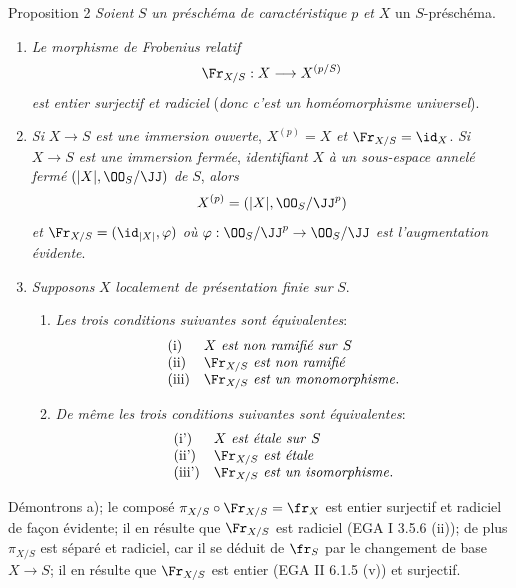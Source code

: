 \begin{statement}{Proposition 2}
\emph{Soient} $S$ \emph{un préschéma de caractéristique} $p$ \emph{et} $X$ un $S$-préschéma.
\begin{enumerate}[label=\alph*)]
\item \emph{Le morphisme de Frobenius relatif}
\[
\Fr_{X/S}:X\longrightarrow X^{(p/S)}
\]
\emph{est entier surjectif et radiciel} (\emph{donc c'est un homéomorphisme universel}).

\item \emph{Si} $X\to S$ \emph{est une
immersion ouverte}, $X^{(p)}=X$ \emph{et} $\Fr_{X/S}=\id_X$. \emph{Si} $X\to S$ \emph{est une immersion fermée}, \emph{identifiant} $X$ \emph{à un sous-espace annelé fermé} $(|X|,\OO_S/\JJ)$ \emph{de} $S$, \emph{alors}
\[
X^{(p)}=(|X|,\OO_S/\JJ^p)
\]
\emph{et} $\Fr_{X/S}=(\id_{|X|},\varphi)$ \emph{où} $\varphi:\OO_S/\JJ^p\to\OO_S/\JJ$ \emph{est l'augmentation évidente}.

\item \emph{Supposons} $X$ \emph{localement de présentation finie sur} $S$.
\begin{enumerate}[label=\arabic*)]
\item \emph{Les trois conditions suivantes sont équivalentes}:
\[
\begin{array}{ll}
\text{(i)}& X\text{ \emph{est non ramifié sur} }S\\
\text{(ii)}& \Fr_{X/S}\text{ \emph{est non ramifié}}\\
\text{(iii)}& \Fr_{X/S}\text{ \emph{est un monomorphisme}}.
\end{array}
\]
\item \emph{De même les trois conditions suivantes sont équivalentes}:
\[
\begin{array}{ll}
\text{(i')}& X\text{ \emph{est étale sur} }S\\
\text{(ii')}& \Fr_{X/S}\text{ \emph{est étale}}\\
\text{(iii')}& \Fr_{X/S}\text{ \emph{est un isomorphisme}}.
\end{array}
\]
\end{enumerate}
\end{enumerate}
\end{statement}

Démontrons a); le composé $\pi_{X/S}\circ\Fr_{X/S}=\fr_X$ est entier surjectif et radiciel de façon évidente; il en résulte que $\Fr_{X/S}$ est radiciel (EGA I 3.5.6 (ii)); de plus $\pi_{X/S}$ est séparé et radiciel, car il se déduit de $\fr_S$ par le changement de base $X\to S$; il en résulte que $\Fr_{X/S}$ est entier (EGA II 6.1.5 (v)) et surjectif.

